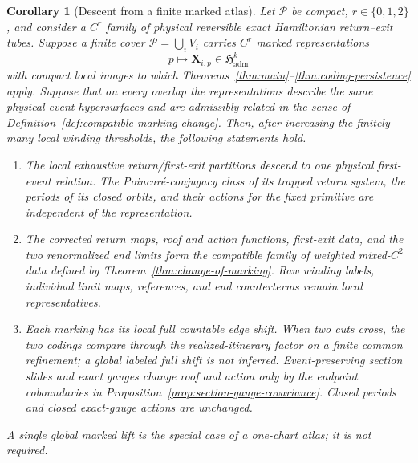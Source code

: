 \documentclass[11pt]{amsart}
\numberwithin{equation}{section}
\newtheorem{corollary}[theorem]{Corollary}
\theoremstyle{definition}
\theoremstyle{remark}
\begin{document}
\begin{corollary}[Descent from a finite marked atlas]
\label{cor:physical-covariance}
Let $\mathcal P$ be compact, $r\in\{0,1,2\}$, and consider a $C^r$
family of physical reversible exact Hamiltonian return--exit tubes.
Suppose a finite cover $\mathcal P=\bigcup_iV_i$ carries $C^r$ marked
representations
\[
 p\longmapsto\mathbf X_{i,p}\in\mathfrak H_{\mathrm{adm}}^k
\]
with compact local images to which
Theorems~\ref{thm:main}--\ref{thm:coding-persistence} apply.  Suppose that
on every overlap the representations describe the same physical event
hypersurfaces and are admissibly related in the sense of
Definition~\ref{def:compatible-marking-change}.  Then, after increasing
the finitely many local winding thresholds, the following statements hold.
\begin{enumerate}
\renewcommand{\labelenumi}{\textup{(\roman{enumi})}}
\item The local exhaustive return/first-exit partitions descend to one
physical first-event relation.  The Poincar\'e-conjugacy class of its
trapped return system, the periods of its closed orbits, and their actions
for the fixed primitive are independent of the representation.
\item The corrected return maps, roof and action functions, first-exit
data, and the two renormalized end limits form the compatible family of
weighted mixed-$C^2$ data defined by
Theorem~\ref{thm:change-of-marking}.  Raw winding labels, individual limit
maps, references, and end counterterms remain local representatives.
\item Each marking has its local full countable edge shift.  When two cuts
cross, the two codings compare through the realized-itinerary factor on a
finite common refinement; a global labeled full shift is not inferred.
Event-preserving section slides and exact gauges change roof and action
only by the endpoint coboundaries in
Proposition~\ref{prop:section-gauge-covariance}.  Closed periods and closed
exact-gauge actions are unchanged.
\end{enumerate}
A single global marked lift is the special case of a one-chart atlas; it is
not required.
\end{corollary}
\end{document}
